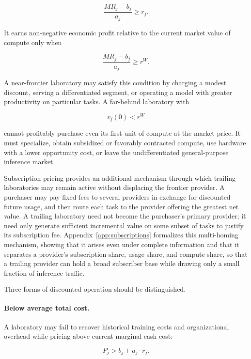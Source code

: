 \documentclass[11pt]{article}
\begin{document}
\begin{equation}\frac{MR_j-b_j}{a_j}\geq r_j.\end{equation}

It earns non-negative economic profit relative to the current market value of compute only when

\begin{equation}\frac{MR_j-b_j}{a_j}\geq r^W.\end{equation}

A near-frontier laboratory may satisfy this condition by charging a modest discount, serving a differentiated segment, or operating a model with greater productivity on particular tasks. A far-behind laboratory with

\begin{equation}v_j(0)<r^W\end{equation}

cannot profitably purchase even its first unit of compute at the market price. It must specialize, obtain subsidized or favorably contracted compute, use hardware with a lower opportunity cost, or leave the undifferentiated general-purpose inference market.

Subscription pricing provides an additional mechanism through which trailing laboratories may remain active without displacing the frontier provider. A purchaser may pay fixed fees to several providers in exchange for discounted future usage, and then route each task to the provider offering the greatest net value. A trailing laboratory need not become the purchaser's primary provider; it need only generate sufficient incremental value on some subset of tasks to justify its subscription fee. Appendix~\ref{app:subscriptions} formalizes this multi-homing mechanism, showing that it arises even under complete information and that it separates a provider's subscription share, usage share, and compute share, so that a trailing provider can hold a broad subscriber base while drawing only a small fraction of inference traffic.

Three forms of discounted operation should be distinguished.

\paragraph{Below average total cost.} A laboratory may fail to recover historical training costs and organizational overhead while pricing above current marginal cash cost:

\begin{equation}P_j>b_j+a_j\cdot r_j.\end{equation}
\end{document}
